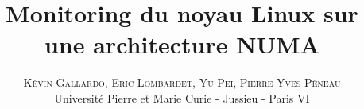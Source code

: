 \documentclass[twoside]{article}
\title{\vspace{-15mm}\fontsize{24pt}{10pt}\selectfont\textbf{Monitoring du noyau Linux sur une architecture NUMA}}
\author{
\large
\textsc{Kévin Gallardo, Eric Lombardet, Yu Pei, Pierre-Yves Péneau}\\[2mm] 
\normalsize Université Pierre et Marie Curie - Jussieu - Paris VI
\vspace{-5mm}
}
\date{}
\begin{document}
  \maketitle

  \thispagestyle{fancy}

  \begin{abstract}
    \noindent 
  \end{abstract}

  \begin{multicols}{2}
    
  \end{multicols}
\end{document}
